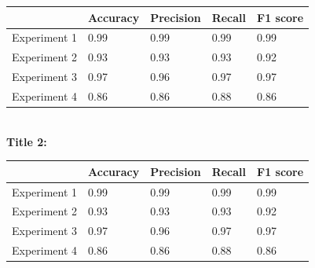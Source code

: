 \documentclass[a1paper,portrait,fontscale=0.410]{baposter}
\begin{document}
\begin{poster}
{\begin{center}
\begin{footnotesize}
\begin{tabular}{l l l l l}
\toprule
 & Accuracy & Precision & Recall & F1 score\\
\midrule
Experiment 1 & 0.99 & 0.99 & 0.99 & 0.99 \\
Experiment 2 & 0.93 & 0.93 & 0.93 & 0.92 \\
Experiment 3 & 0.97 & 0.96 & 0.97 & 0.97 \\
Experiment 4 & 0.86 & 0.86 & 0.88 & 0.86 \\
\bottomrule
\end{tabular}
\end{footnotesize}
\end{center} 



\textbf{\\Title 2:} 

\begin{center}
\begin{footnotesize}
\begin{tabular}{l l l l l}
\toprule
 & Accuracy & Precision & Recall & F1 score\\
\midrule
Experiment 1 & 0.99 & 0.99 & 0.99 & 0.99 \\
Experiment 2 & 0.93 & 0.93 & 0.93 & 0.92 \\
Experiment 3 & 0.97 & 0.96 & 0.97 & 0.97 \\
Experiment 4 & 0.86 & 0.86 & 0.88 & 0.86 \\
\bottomrule
\end{tabular}
\end{footnotesize}
\end{center} 



}




\end{poster}
\end{document}
